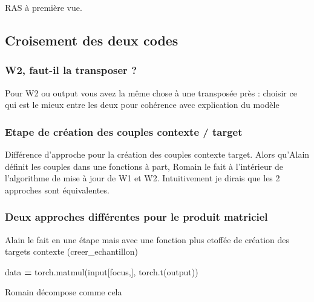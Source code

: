 \documentclass[11pt,french,french]{article}
\newenvironment{Shaded}{\begin{snugshade}}{\end{snugshade}}
\newcommand{\BuiltInTok}[1]{#1}
\newcommand{\NormalTok}[1]{#1}
\newcommand{\OperatorTok}[1]{\textcolor[rgb]{0.81,0.36,0.00}{\textbf{#1}}}
\begin{document}
RAS à première vue.

\hypertarget{croisement-des-deux-codes}{%
\subsection{Croisement des deux codes}\label{croisement-des-deux-codes}}

\hypertarget{w2-faut-il-la-transposer}{%
\subsubsection{W2, faut-il la transposer
?}\label{w2-faut-il-la-transposer}}

Pour W2 ou output vous avez la même chose à une transposée près :
choisir ce qui est le mieux entre les deux pour cohérence avec
explication du modèle

\hypertarget{etape-de-cruxe9ation-des-couples-contexte-target}{%
\subsubsection{Etape de création des couples contexte /
target}\label{etape-de-cruxe9ation-des-couples-contexte-target}}

Différence d'approche pour la création des couples contexte target.
Alors qu'Alain définit les couples dans une fonctions à part, Romain le
fait à l'intérieur de l'algorithme de mise à jour de W1 et W2.
Intuitivement je dirais que les 2 approches sont équivalentes.

\hypertarget{deux-approches-diffuxe9rentes-pour-le-produit-matriciel}{%
\subsubsection{Deux approches différentes pour le produit
matriciel}\label{deux-approches-diffuxe9rentes-pour-le-produit-matriciel}}

Alain le fait en une étape mais avec une fonction plus etoffée de
création des targets contexte (creer\_echantillon)

\begin{Shaded}
\begin{Highlighting}[]
\NormalTok{data }\OperatorTok{=}\NormalTok{ torch.matmul(}\BuiltInTok{input}\NormalTok{[focus,], torch.t(output))}
\end{Highlighting}
\end{Shaded}

Romain décompose comme cela
\end{document}
